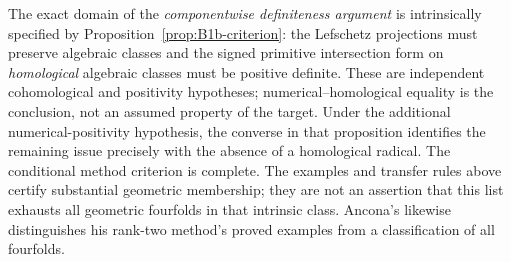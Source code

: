 The exact domain of the \emph{componentwise definiteness argument}
is intrinsically specified by Proposition~\ref{prop:B1b-criterion}:
the Lefschetz projections must preserve algebraic classes and the
signed primitive intersection form on \emph{homological} algebraic
classes must be positive definite. These are independent cohomological
and positivity hypotheses; numerical--homological equality is the
conclusion, not an assumed property of the target. Under the additional
numerical-positivity hypothesis, the converse in that proposition
identifies the remaining issue precisely with the absence of a
homological radical. The conditional method criterion is complete.
The examples and transfer rules above certify substantial geometric
membership; they are not an assertion that this list exhausts all
geometric fourfolds in that intrinsic class. Ancona's
\cite[Remark~A.10]{BAncona2021} likewise distinguishes his rank-two
method's proved examples from a classification of all fourfolds.
